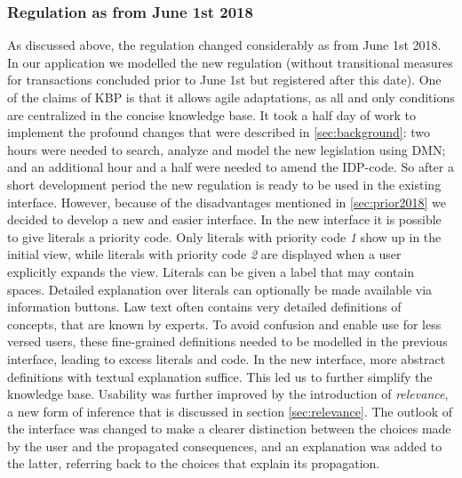 \subsubsection{Regulation as from June 1st 2018}
As discussed above, the regulation changed considerably as from June 1st 2018.
In our application we modelled the new regulation (without transitional measures for transactions concluded prior to June 1st but registered after this date).
One of the claims of KBP is that it allows agile adaptations, as all and only conditions are centralized in the concise knowledge base.
It took a half day of work to implement the profound changes that were described in \ref{sec:background}: two hours were needed to search, analyze and model the new legislation using DMN; and an additional hour and a half were needed to amend the IDP-code. %
So after a short development period the new regulation is ready to be used in the existing interface.
However, because of the disadvantages mentioned in \ref{sec:prior2018} we decided to develop a new and easier interface.
In the new interface it is possible to give literals a priority code.
Only literals with priority code \textit{1} show up in the initial view, while literals with priority code \textit{2} are displayed when a user explicitly expands the view.
Literals can be given a label that may contain spaces.
Detailed explanation over literals can optionally be made available via information buttons.
Law text often contains very detailed definitions of concepts, that are known by experts.
To avoid confusion and enable use for less versed users, these fine-grained definitions needed to be modelled in the previous interface, leading to excess literals and code.
In the new interface, more abstract definitions with textual explanation suffice.
This led us to further simplify the knowledge base.
Usability was further improved by the introduction of \emph{relevance}, a new form of inference that is discussed in section \ref{sec:relevance}.
The outlook of the interface was changed to make a clearer distinction between the choices made by the user and the propagated consequences, and an explanation was added to the latter, referring back to the choices that explain its propagation.

